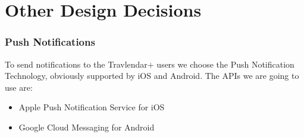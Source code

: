 \begin{center}
\end{center}
%
%
\section{Other Design Decisions}

\subsubsection{Push Notifications}
To send notifications to the Travlendar+ users we choose the Push Notification Technology, obviously supported by iOS and Android.
The APIs we are going to use are:
\begin{itemize}
\item	Apple Push Notification Service for iOS
\item	Google Cloud Messaging for Android 
\end{itemize}
%
%
